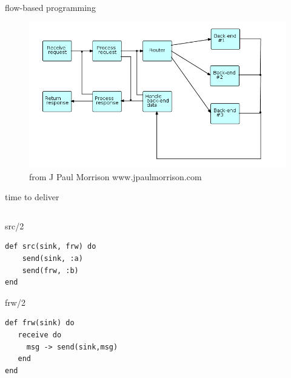 \begin{frame}{flow-based programming}

\begin{figure}
\includegraphics[scale=0.4]{fbp.png}
\caption{from J Paul Morrison www.jpaulmorrison.com}
\end{figure}
\end{frame}


\begin{frame}[fragile]{time to deliver}

\begin{columns}
   \begin{column}{.4\linewidth}
     \begin{block}{src/2}
\begin{verbatim}
def src(sink, frw) do
    send(sink, :a)
    send(frw, :b)
end
\end{verbatim}
      \end{block}
     \begin{block}{frw/2}
\begin{verbatim}
def frw(sink) do
   receive do
     msg -> send(sink,msg)
   end
end
\end{verbatim}
      \end{block}
    \end{column}
\pause
    \begin{column}{.6\linewidth}
    \end{column}

  \end{columns}


\end{frame}
 
